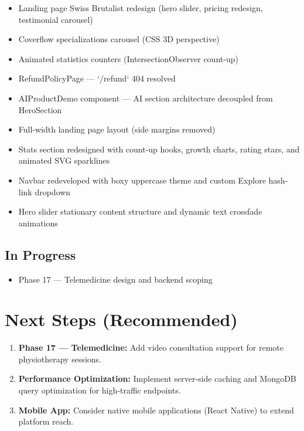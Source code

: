 \documentclass[11pt,a4paper]{article}
\begin{document}
\begin{itemize}
{\begin{itemize}
  \item Landing page Swiss Brutalist redesign (hero slider, pricing redesign, testimonial carousel)
  \item Coverflow specializations carousel (CSS 3D perspective)
  \item Animated statistics counters (IntersectionObserver count-up)
  \item RefundPolicyPage — `/refund` 404 resolved
  \item AIProductDemo component — AI section architecture decoupled from HeroSection
  \item Full-width landing page layout (side margins removed)
  \item Stats section redesigned with count-up hooks, growth charts, rating stars, and animated SVG sparklines
  \item Navbar redeveloped with boxy uppercase theme and custom Explore hash-link dropdown
  \item Hero slider stationary content structure and dynamic text crossfade animations
\end{itemize}

\subsection{In Progress}

\begin{itemize}
  \item Phase 17 — Telemedicine design and backend scoping
\end{itemize}

\newpage

\section{Next Steps (Recommended)}

\begin{enumerate}
  \item \textbf{Phase 17 — Telemedicine:} Add video consultation support for remote
        physiotherapy sessions.
  \item \textbf{Performance Optimization:} Implement server-side caching and MongoDB query
        optimization for high-traffic endpoints.
  \item \textbf{Mobile App:} Consider native mobile applications (React Native) to extend
        platform reach.
\end{enumerate}

}
\end{itemize}
\end{document}
